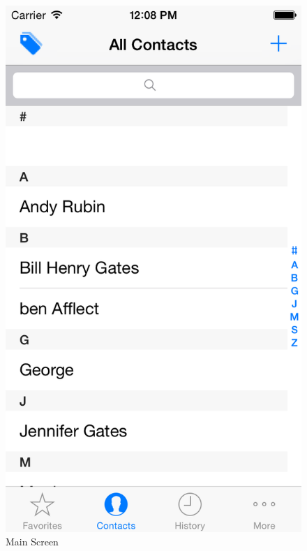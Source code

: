 \begin{figure}[!h]\textsl{}
\begin{centering}
\includegraphics[scale=0.3]{pics/mainscreen}
\caption{Main Screen}\label{fg:mainscreen}
\end{centering}
\end{figure}

